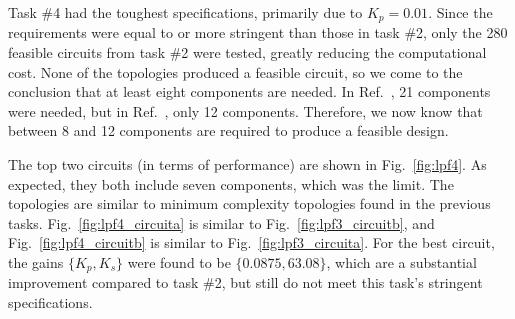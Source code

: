Task \#4 had the toughest specifications, primarily due to $K_p = 0.01$.
Since the requirements were equal to or more stringent than those in task \#2, only the 280 feasible circuits from task \#2 were tested, greatly reducing the computational cost. 
None of the topologies produced a feasible circuit, so we come to the conclusion that at least eight components are needed.
In Ref.~\cite{Lohn1999a}, 21 components were needed, but in Ref.~\cite{Goh2001a}, only 12 components.
Therefore, we now know that between 8 and 12 components are required to produce a feasible design.

The top two circuits (in terms of performance) are shown in Fig.~\ref{fig:lpf4}.
As expected, they both include seven components, which was the limit.
The topologies are similar to minimum complexity topologies found in the previous tasks. 
Fig.~\ref{fig:lpf4_circuita} is similar to Fig.~\ref{fig:lpf3_circuitb}, and Fig.~\ref{fig:lpf4_circuitb} is similar to Fig.~\ref{fig:lpf3_circuita}.
For the best circuit, the gains $\{K_p,K_s\}$ were found to be $\{0.0875, 63.08\}$, which are a substantial improvement compared to task \#2, but still do not meet this task's stringent specifications.